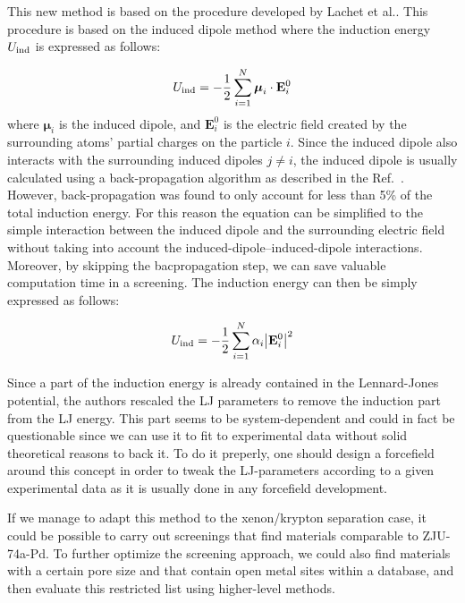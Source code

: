 \documentclass[main]{subfiles}
\begin{document}
This new method is based on the procedure developed by Lachet et al.\autocite{Lachet_1998}. This procedure is based on the induced dipole method where the induction energy $U_{\text{ind}}$ is expressed as follows:

\begin{equation}
  U_{\text{ind}} = -\frac{1}{2} \sum_{i=1}^{N} \boldsymbol{\mu}_i \cdot \mathbf{E}_i^0
\end{equation}
where $\boldsymbol{\mu}_i$ is the induced dipole, and $\mathbf{E}_i^0$ is the electric field created by the surrounding atoms' partial charges on the particle $i$. Since the induced dipole also interacts with the surrounding induced dipoles $j\neq i$, the induced dipole is usually calculated using a back-propagation algorithm as described in the Ref.~\cite{Lachet_1998}. However, back-propagation was found to only account for less than {5\%} of the total induction energy. For this reason the equation can be simplified to the simple interaction between the induced dipole and the surrounding electric field without taking into account the induced-dipole--induced-dipole interactions. Moreover, by skipping the bacpropagation step, we can save valuable computation time in a screening. The induction energy can then be simply expressed as follows:

\begin{equation}
  U_{\text{ind}} = -\frac{1}{2} \sum_{i=1}^{N} \alpha_i {\left\lvert\mathbf{E}_i^0\right\rvert}^2
\end{equation}

Since a part of the induction energy is already contained in the Lennard-Jones potential, the authors rescaled the LJ parameters to remove the induction part from the LJ energy. This part seems to be system-dependent and could in fact be questionable since we can use it to fit to experimental data without solid theoretical reasons to back it. To do it preperly, one should design a forcefield around this concept in order to tweak the LJ-parameters according to a given experimental data as it is usually done in any forcefield development. 

If we manage to adapt this method to the xenon/krypton separation case, it could be possible to carry out screenings that find materials comparable to ZJU-74a-Pd. To further optimize the screening approach, we could also find materials with a certain pore size and that contain open metal sites within a database, and then evaluate this restricted list using higher-level methods. 



\OnlyInSubfile{\printglobalbibliography}
\end{document}
